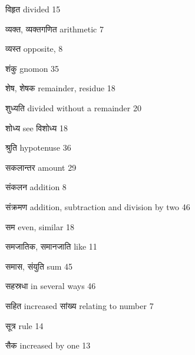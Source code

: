 \documentclass[]{article}
\begin{document}
{विहृत divided 15}

{व्यक्त, व्यक्तगणित arithmetic 7}

{व्यस्त opposite, 8}

{शंकु gnomon 35}

{शेष, शेषक remainder, residue 18}

{शुध्यति divided without a remainder 20}

{शोध्य see विशोध्य 18}

{श्रुति hypotenuse 36}

{सकलान्तर amount 29}

{संकलन addition 8}

{संक्रमण addition, subtraction and division by two 46}

{सम even, similar 18}

{समजातिक, समानजाति like 11}

{समास, संयुति sum 45}

{सहस्रधा in several ways 46}

{सहित increased सांख्य relating to number 7}

{सूत्र rule 14}

{सैक increased by one 13}
\end{document}
